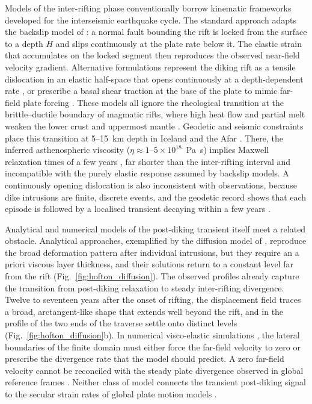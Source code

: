 \documentclass[extra]{gji}
\begin{document}
Models of the inter-rifting phase conventionally borrow kinematic
frameworks developed for the interseismic earthquake cycle. The standard
approach adapts the backslip model of \citet{savage1978asthenosphere}: a
normal fault bounding the rift is locked from the surface to a depth $H$
and slips continuously at the plate rate below it. The elastic strain that
accumulates on the locked segment then reproduces the observed near-field
velocity gradient. Alternative formulations represent the diking
rift as a tensile dislocation in an elastic half-space that opens
continuously at a depth-dependent rate \citep{lafemina2005geodetic,konca2018slip},
or prescribe a basal shear traction at the base of the plate to mimic
far-field plate forcing \citep{ali2014geodetic}. These models
all ignore the rheological
transition at the brittle--ductile boundary of magmatic rifts, where high
heat flow and partial melt weaken the lower crust and uppermost mantle
\citep{prodehl1997east,plasman2017lithospheric}. Geodetic and seismic
constraints place this transition at 5--15~km depth in Iceland and the
Afar \citep{stevens2021tectonic,weinstein2017fault}. There, the inferred
asthenospheric viscosity ($\eta\approx1$--$5\times10^{18}$~Pa~s) implies
Maxwell relaxation times of a few years \citep{hofton1996post,nooner2009post},
far shorter than the inter-rifting interval and incompatible with the
purely elastic response assumed by backslip models. A continuously opening
dislocation is also inconsistent with observations, because
dike intrusions are finite, discrete events, and the geodetic record shows
that each episode is followed by a localised transient decaying within a
few years \citep{foulger1992post,reiss2022shallow}.

Analytical and numerical models of the post-diking transient itself meet
a related obstacle. Analytical approaches, exemplified by the diffusion model
of \citet{foulger1992post}, reproduce the broad deformation pattern after
individual intrusions, but they require an a priori viscous layer
thickness, and their solutions return to a constant level far from the
rift (Fig.~\ref{fig:hofton_diffusion}). The observed profiles already
capture the transition from post-diking relaxation to steady
inter-rifting divergence. Twelve to seventeen years after the onset of
rifting, the displacement field traces a broad, arctangent-like shape
that extends well beyond the rift, and in the profile of
\citet{hofton1996post} the two ends of the traverse settle onto distinct
levels (Fig.~\ref{fig:hofton_diffusion}b).
In numerical visco-elastic simulations
\citep{hofton1995horizontal,hofton1996post,nooner2009post}, the lateral
boundaries of the finite domain must either force the far-field velocity
to zero or prescribe the divergence rate that the model should predict.
A zero far-field velocity cannot be reconciled with the steady plate
divergence observed in global reference frames
\citep{fernandes2004defining,altamimi2016itrf2014}. Neither class of
model connects the transient post-diking signal to the secular
strain rates of global plate motion models
\citep{kreemer2014geodetic,stamps2018virtual}.
\end{document}
